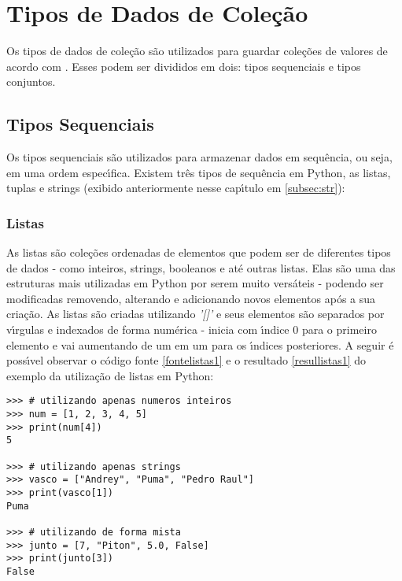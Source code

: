 \section{Tipos de Dados de Cole\c{c}\~{a}o}
Os tipos de dados de cole\c{c}\~{a}o s\~{a}o utilizados para guardar cole\c{c}\~{o}es de valores de acordo com \cite{Perkovic2016}. Esses podem ser divididos em dois: tipos sequenciais e tipos conjuntos.
\subsection{Tipos Sequenciais}
Os tipos sequenciais s\~{a}o utilizados para armazenar dados em sequ\^{e}ncia, ou seja, em uma ordem espec\'{\i}fica. Existem tr\^{e}s tipos de sequ\^{e}ncia em Python, as listas, tuplas e strings (exibido anteriormente nesse cap\'{\i}tulo em \ref{subsec:str}):				

\subsubsection{Listas} \label{cap3/3.2.1}
As listas s\~{a}o cole\c{c}\~{o}es ordenadas de elementos que podem ser de diferentes tipos de dados - como inteiros, strings, booleanos e at\'{e} outras listas. Elas s\~{a}o uma das estruturas mais utilizadas em Python por serem muito vers\'{a}teis - podendo ser modificadas removendo, alterando e adicionando novos elementos ap\'{o}s a sua cria\c{c}\~{a}o. As listas s\~{a}o criadas utilizando \textsl{'[]'} e seus elementos s\~{a}o separados por v\'{\i}rgulas e indexados de forma num\'{e}rica - inicia com \'{\i}ndice 0 para o primeiro elemento e vai aumentando de um em um para os \'{\i}ndices posteriores. A seguir \'{e} poss\'{\i}vel observar o c\'{o}digo fonte \ref{fontelistas1} e o resultado \ref{resullistas1} do exemplo da utiliza\c{c}\~{a}o de listas em Python:

\begin{lstlisting}
>>> # utilizando apenas numeros inteiros
>>> num = [1, 2, 3, 4, 5]
>>> print(num[4])
5

>>> # utilizando apenas strings 
>>> vasco = ["Andrey", "Puma", "Pedro Raul"]
>>> print(vasco[1])
Puma

>>> # utilizando de forma mista
>>> junto = [7, "Piton", 5.0, False]
>>> print(junto[3])
False
\end{lstlisting}

